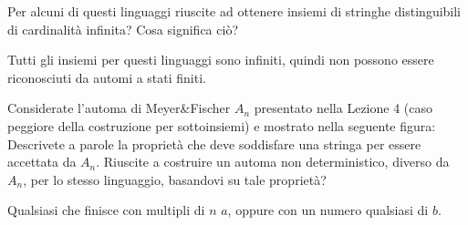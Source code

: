 \documentclass[12pt, answers]{exam}
\begin{document}
\begin{questions}
		Per alcuni di questi linguaggi riuscite ad ottenere insiemi di stringhe distinguibili di cardinalità infinita? Cosa significa ciò?
		\begin{solution}
			Tutti gli insiemi per questi linguaggi sono infiniti, quindi non possono essere riconosciuti da automi a stati finiti.
		\end{solution}
		\question Considerate l'automa di Meyer\&Fischer $A_n$ presentato nella Lezione 4 (caso peggiore della costruzione per sottoinsiemi) e mostrato nella seguente figura:
		Descrivete a parole la proprietà che deve soddisfare una stringa per essere accettata da $A_n$.
		Riuscite a costruire un automa non deterministico, diverso da $A_n$, per lo stesso linguaggio, basandovi su tale proprietà?
		\begin{solution}
			Qualsiasi che finisce con multipli di $n$ $a$, oppure con un numero qualsiasi di $b$.
		\end{solution}

	\end{questions}
\end{document}
